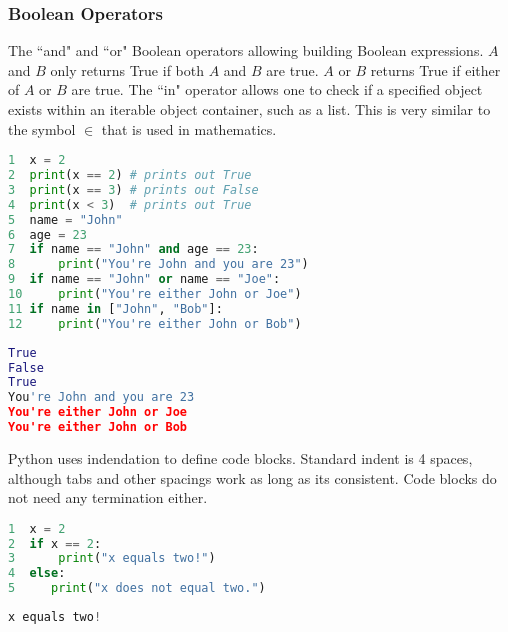 \documentclass[crop=false,class=book]{standalone}
\begin{document}
\subsubsection{Boolean Operators}
The ``and" and ``or" Boolean operators allowing building Boolean expressions. $A$ and $B$ only returns True if both $A$ and $B$ are true. $A$ or $B$ returns True if either of $A$ or $B$ are true. The ``in" operator allows one to check if a specified object exists within an iterable object container, such as a list. This is very similar to the symbol $\in$ that is used in mathematics.\newline
\begin{minipage}[t]{0.48\textwidth}
\begin{lstlisting}[language=python,frame=single,basicstyle=\footnotesize,frame=single,caption=input]
1  x = 2
2  print(x == 2) # prints out True
3  print(x == 3) # prints out False
4  print(x < 3)  # prints out True
5  name = "John"
6  age = 23
7  if name == "John" and age == 23:
8      print("You're John and you are 23")
9  if name == "John" or name == "Joe":
10     print("You're either John or Joe")
11 if name in ["John", "Bob"]:
12     print("You're either John or Bob")
\end{lstlisting}
\end{minipage}\hfill
\begin{minipage}[t]{0.48\textwidth}
\begin{lstlisting}[language=python,frame=single,basicstyle=\footnotesize,frame=single,caption=output]
True
False
True
You're John and you are 23
You're either John or Joe
You're either John or Bob
\end{lstlisting}
\end{minipage}
Python uses indendation to define code blocks. Standard indent is 4 spaces, although tabs and other spacings work as long as its consistent. Code blocks do not need any termination either.\newline
\begin{minipage}[t]{.48\textwidth}
\centering
\begin{lstlisting}[language=python,frame=single,basicstyle=\footnotesize,frame=single,caption=input]
1  x = 2
2  if x == 2:
3      print("x equals two!")
4  else:
5     print("x does not equal two.")
\end{lstlisting}
\end{minipage}\hfill
\begin{minipage}[t]{.48\textwidth}
\centering
\begin{lstlisting}[language=python,frame=single,basicstyle=\footnotesize,frame=single,caption=output]
x equals two!
\end{lstlisting}
\end{minipage}\newline
\end{document}
